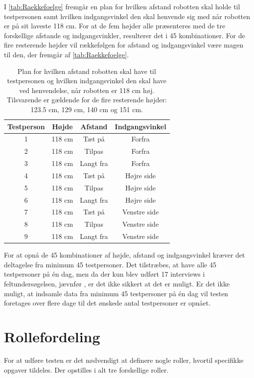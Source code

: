 I \autoref{tab:Raekkefoelge} fremgår en plan for hvilken afstand robotten skal holde til testpersonen samt hvilken indgangsvinkel den skal henvende sig med når robotten er på sit laveste 118 cm. For at de fem højder alle præsenteres med de tre forskellige afstande og indgangsvinkler, resulterer det i 45 kombinationer. For de fire resterende højder vil rækkefølgen for afstand og indgangsvinkel være magen til den, der fremgår af \autoref{tab:Raekkefoelge}.    
%
\begin{table}[H]
	\centering 
	\begin{tabular}{c|c|c|c}
		Testperson  & Højde & Afstand & Indgangsvinkel \\\hline
		1   & 118 cm & Tæt på & Forfra  \\\hline
		2   & 118 cm & Tilpas & Forfra \\ \hline
		3   & 118 cm & Langt fra  & Forfra \\ \hline
		4   & 118 cm & Tæt på & Højre side \\ \hline
		5   & 118 cm & Tilpas & Højre side \\ \hline
		6   & 118 cm & Langt fra & Højre side \\ \hline
		7   & 118 cm & Tæt på & Venstre side \\ \hline
		8   & 118 cm & Tilpas & Venstre side \\ \hline
		9   & 118 cm & Langt fra  & Venstre side 
	\end{tabular} 
	\caption{Plan for hvilken afstand robotten skal have til testpersonen og hvilken indgangsvinkel den skal have ved henvendelse, når robotten er 118 cm høj. Tilsvarende er gældende for de fire resterende højder: 123.5 cm, 129 cm, 140 cm og 151 cm.}
	\label{tab:Raekkefoelge}       
\end{table}
\noindent
%
For at opnå de 45 kombinationer af højde, afstand og indgangsvinkel kræver det deltagelse fra minimum 45 testpersoner. Det tilstræbes, at have alle 45 testpersoner på én dag, men da der kun blev udført 17 interviews i feltundersøgelsen, jævnfør , er det ikke sikkert at det er muligt. Er det ikke muligt, at indsamle data fra minimum 45 testpersoner på én dag vil testen foretages over flere dage til det ønskede antal testpersoner er opnået.   

\section{Rollefordeling}
\label{TestAfSkalaRollefordeling}
%
For at udføre testen er det nødvendigt at definere nogle roller, hvortil specifikke opgaver tildeles. Der opstilles i alt tre forskellige roller. 
%

